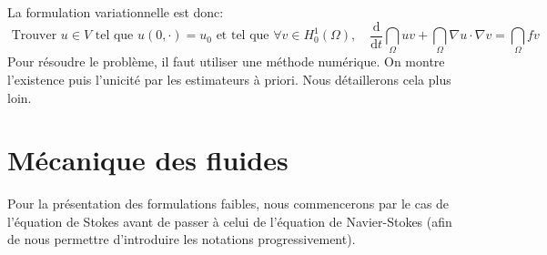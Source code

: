 \medskip
La formulation variationnelle est donc:
\begin{equation}
\text{ Trouver } u\in V \text{ tel que } u(0,\cdot)=u_0 \text{ et tel que } \forall v\in H^1_0(\Omega),\quad
\dfrac{\mathrm d}{\mathrm dt}\dint_\Omega uv+\dint_\Omega \nabla u\cdot\nabla v=\dint_\Omega fv
\end{equation}
\medskip
Pour résoudre le problème, il faut utiliser une méthode numérique. On montre l'existence puis l'unicité par les estimateurs à priori.
Nous détaillerons cela plus loin.

\medskip
\section{Mécanique des fluides}
Pour la présentation des formulations faibles, nous commencerons par le cas de
l'équation de Stokes avant de passer à celui de l'équation de Navier-Stokes (afin
de nous permettre d'introduire les notations progressivement).


\medskip

